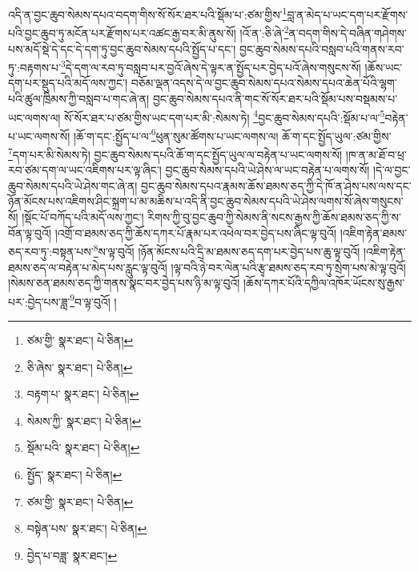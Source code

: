 འདི་ན་བྱང་ཆུབ་སེམས་དཔའ་བདག་གིས་སོ་སོར་ཐར་པའི་སྡོམ་པ་:ཙམ་གྱིས་\footnote{ཙམ་གྱི་  སྣར་ཐང་།  པེ་ཅིན། }བླ་ན་མེད་པ་ཡང་དག་པར་རྫོགས་པའི་བྱང་ཆུབ་ཏུ་མངོན་པར་རྫོགས་པར་འཚང་རྒྱ་བར་མི་ནུས་སོ། །འོ་ན་:ཅི་ཞེ་\footnote{ཅི་ཞེས་  སྣར་ཐང་།  པེ་ཅིན། }ན་བདག་གིས་དེ་བཞིན་གཤེགས་པས་མདོ་སྡེ་དེ་དང་དེ་དག་ཏུ་བྱང་ཆུབ་སེམས་དཔའི་སྤྱོད་པ་དང་། བྱང་ཆུབ་སེམས་དཔའི་བསླབ་པའི་གནས་རབ་ཏུ་:བརྟགས་པ་\footnote{བརྟག་པ་  སྣར་ཐང་།  པེ་ཅིན། }དེ་དག་ལ་རབ་ཏུ་བསླབ་པར་བྱའོ་ཞེས་དེ་ལྟར་ན་སྤྱོད་པར་བྱེད་པའོ་ཞེས་གསུངས་སོ། །ཆོས་ཡང་དག་པར་སྡུད་པའི་མདོ་ལས་ཀྱང་། བཅོམ་ལྡན་འདས་དེ་ལ་བྱང་ཆུབ་སེམས་དཔའ་སེམས་དཔའ་ཆེན་པོའི་ལྷག་པའི་ཚུལ་ཁྲིམས་ཀྱི་བསླབ་པ་གང་ཞེ་ན། བྱང་ཆུབ་སེམས་དཔའ་ནི་གང་སོ་སོར་ཐར་པའི་སྡོམ་པས་བསྡམས་པ་ཡང་ལགས་ལ། སོ་སོར་ཐར་པ་ཙམ་གྱིས་ཡང་དག་པར་མི་:སེམས་ཏེ། \footnote{སེམས་ཀྱི་  སྣར་ཐང་།  པེ་ཅིན། }བྱང་ཆུབ་སེམས་དཔའི་:སྡོམ་པ་ལ་\footnote{སྡོམ་པའི་  སྣར་ཐང་།  པེ་ཅིན། }བརྟེན་པ་ཡང་ལགས་སོ། །ཆོ་ག་དང་:སྤྱོད་པ་ལ་\footnote{སྤྱོད་  སྣར་ཐང་།  པེ་ཅིན། }ཕུན་སུམ་ཚོགས་པ་ཡང་ལགས་ལ། ཆོ་ག་དང་སྤྱོད་ཡུལ་:ཙམ་གྱིས་\footnote{ཙམ་གྱི་  སྣར་ཐང་།  པེ་ཅིན། }དག་པར་མི་སེམས་ཏེ། བྱང་ཆུབ་སེམས་དཔའི་ཆོ་ག་དང་སྤྱོད་ཡུལ་ལ་བརྟེན་པ་ཡང་ལགས་སོ། །ཁ་ན་མ་ཐོ་བ་ཕྲ་རབ་ཙམ་དག་ལ་ཡང་འཇིགས་པར་ལྟ་ཞིང་། བྱང་ཆུབ་སེམས་དཔའི་ཡེ་ཤེས་ལ་ཡང་བརྟེན་པ་ལགས་སོ། །དེ་ལ་བྱང་ཆུབ་སེམས་དཔའི་ཡེ་ཤེས་གང་ཞེ་ན། བྱང་ཆུབ་སེམས་དཔའ་རྣམས་ཆོས་ཐམས་ཅད་ཀྱི་དེ་ཁོ་ན་ཤེས་པས་ལས་དང་ཉོན་མོངས་པས་འཇིགས་ཤིང་སྐྲག་པ་མ་མཆིས་པ་འདི་ནི་བྱང་ཆུབ་སེམས་དཔའི་ཡེ་ཤེས་ལགས་སོ་ཞེས་གསུངས་སོ། །སྡོང་པོ་བཀོད་པའི་མདོ་ལས་ཀྱང་། རིགས་ཀྱི་བུ་བྱང་ཆུབ་ཀྱི་སེམས་ནི་སངས་རྒྱས་ཀྱི་ཆོས་ཐམས་ཅད་ཀྱི་ས་བོན་ལྟ་བུའོ། །འགྲོ་བ་ཐམས་ཅད་ཀྱི་ཆོས་དཀར་པོ་རྣམ་པར་འཕེལ་བར་བྱེད་པས་ཞིང་ལྟ་བུའོ། །འཇིག་རྟེན་ཐམས་ཅད་རབ་ཏུ་:བསྟན་པས་\footnote{བསྟེན་པས་  སྣར་ཐང་།  པེ་ཅིན། }ས་ལྟ་བུའོ། །ཉོན་མོངས་པའི་དྲི་མ་ཐམས་ཅད་དག་པར་བྱེད་པས་ཆུ་ལྟ་བུའོ། །འཇིག་རྟེན་ཐམས་ཅད་ལ་བརྟེན་པ་མེད་པས་རླུང་ལྟ་བུའོ། །ལྟ་བའི་ཉེ་བར་ལེན་པའི་རྩྭ་ཐམས་ཅད་རབ་ཏུ་སྲེག་པས་མེ་ལྟ་བུའོ། །སེམས་ཅན་ཐམས་ཅད་ཀྱི་གནས་སྣང་བར་བྱེད་པས་ཉི་མ་ལྟ་བུའོ། །ཆོས་དཀར་པོའི་དཀྱིལ་འཁོར་ཡོངས་སུ་རྒྱས་པར་:བྱེད་པས་ཟླ་\footnote{བྱེད་པ་བཟླ་  སྣར་ཐང་། }བ་ལྟ་བུའོ། །
